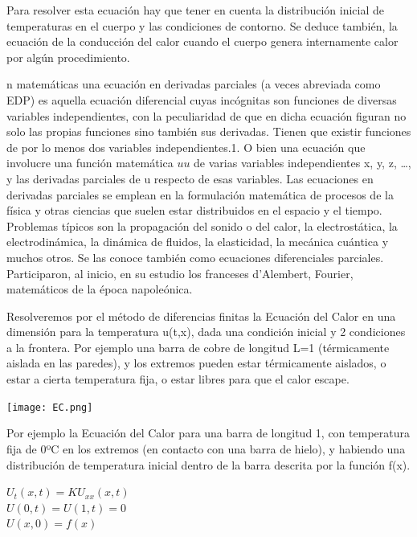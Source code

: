 \documentclass[12pt]{article}
\begin{document}
Para resolver esta ecuación hay que tener en cuenta la distribución inicial de temperaturas en el cuerpo y las condiciones de contorno. Se deduce también, la ecuación de la conducción del calor cuando el cuerpo genera internamente calor por algún procedimiento.

n matemáticas una ecuación en derivadas parciales (a veces abreviada como EDP) es aquella ecuación diferencial cuyas incógnitas son funciones de diversas variables independientes, con la peculiaridad de que en dicha ecuación figuran no solo las propias funciones sino también sus derivadas. Tienen que existir funciones de por lo menos dos variables independientes.1. O bien una ecuación que involucre una función matemática ${\displaystyle u}u$ de varias variables independientes x, y, z, …, y las derivadas parciales de u respecto de esas variables. Las ecuaciones en derivadas parciales se emplean en la formulación matemática de procesos de la física y otras ciencias que suelen estar distribuidos en el espacio y el tiempo. Problemas típicos son la propagación del sonido o del calor, la electrostática, la electrodinámica, la dinámica de fluidos, la elasticidad, la mecánica cuántica y muchos otros. Se las conoce también como ecuaciones diferenciales parciales. Participaron, al inicio, en su estudio los franceses d'Alembert, Fourier, matemáticos de la época napoleónica.

Resolveremos por el método de diferencias finitas la Ecuación del Calor en una dimensión para la temperatura u(t,x), dada una condición inicial y 2 condiciones a la frontera. Por ejemplo una barra de cobre de longitud L=1 (térmicamente aislada en las paredes), y los extremos pueden estar térmicamente aislados, o estar a cierta temperatura fija, o estar libres para que el calor escape.

\begin{center}
    \texttt{[image: EC.png]}
\end{center}

Por ejemplo la Ecuación del Calor para una barra de longitud 1, con temperatura fija de 0ºC en los extremos (en contacto con una barra de hielo), y habiendo una distribución de temperatura inicial dentro de la barra descrita por la función f(x). 

\begin{center}
    $U_{t}(x,t) = KU_{xx}(x,t)$\\
    $U(0,t) = U(1,t) = 0$\\
    $U(x,0) = f(x)$\\
\end{center}
\end{document}
